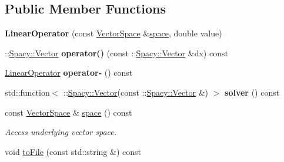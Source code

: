 \subsection*{Public Member Functions}
\begin{DoxyCompactItemize}
\item 
\hypertarget{structSpacy_1_1Scalar_1_1LinearOperator_a35809efc47f61f185314410e39397ea5}{}{\bfseries Linear\+Operator} (const \hyperlink{classSpacy_1_1VectorSpace}{Vector\+Space} \&\hyperlink{classSpacy_1_1VectorBase_aa999dbf9d679d895dfe04c10fbf9f5e9}{space}, double value)\label{structSpacy_1_1Scalar_1_1LinearOperator_a35809efc47f61f185314410e39397ea5}

\item 
\hypertarget{structSpacy_1_1Scalar_1_1LinearOperator_aa978b12a9e892a6929487c8da259d4af}{}\+::\hyperlink{classSpacy_1_1Vector}{Spacy\+::\+Vector} {\bfseries operator()} (const \+::\hyperlink{classSpacy_1_1Vector}{Spacy\+::\+Vector} \&dx) const \label{structSpacy_1_1Scalar_1_1LinearOperator_aa978b12a9e892a6929487c8da259d4af}

\item 
\hypertarget{structSpacy_1_1Scalar_1_1LinearOperator_aba7eb546eca4983adcf2e39155af07d1}{}\hyperlink{structSpacy_1_1Scalar_1_1LinearOperator}{Linear\+Operator} {\bfseries operator-\/} () const \label{structSpacy_1_1Scalar_1_1LinearOperator_aba7eb546eca4983adcf2e39155af07d1}

\item 
\hypertarget{structSpacy_1_1Scalar_1_1LinearOperator_aa4b25737fbff5a431545ae5076e2c0c0}{}std\+::function$<$ \+::\hyperlink{classSpacy_1_1Vector}{Spacy\+::\+Vector}(const \+::\hyperlink{classSpacy_1_1Vector}{Spacy\+::\+Vector} \&) $>$ {\bfseries solver} () const \label{structSpacy_1_1Scalar_1_1LinearOperator_aa4b25737fbff5a431545ae5076e2c0c0}

\item 
\hypertarget{classSpacy_1_1VectorBase_aa999dbf9d679d895dfe04c10fbf9f5e9}{}const \hyperlink{classSpacy_1_1VectorSpace}{Vector\+Space} \& \hyperlink{classSpacy_1_1VectorBase_aa999dbf9d679d895dfe04c10fbf9f5e9}{space} () const \label{classSpacy_1_1VectorBase_aa999dbf9d679d895dfe04c10fbf9f5e9}

\begin{DoxyCompactList}\small\item\em Access underlying vector space. \end{DoxyCompactList}\item 
\hypertarget{classSpacy_1_1VectorBase_a244a3e85ec49dbf2741ca46ea4b711c9}{}void \hyperlink{classSpacy_1_1VectorBase_a244a3e85ec49dbf2741ca46ea4b711c9}{to\+File} (const std\+::string \&) const \label{classSpacy_1_1VectorBase_a244a3e85ec49dbf2741ca46ea4b711c9}


\end{DoxyCompactItemize}

